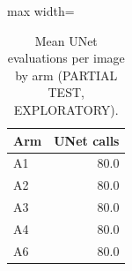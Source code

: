 \begin{table}[t]\centering\small
\caption{Mean UNet evaluations per image by arm (PARTIAL TEST, EXPLORATORY).}\label{tab:partial-cost}
\begin{adjustbox}{max width=\linewidth}
\begin{tabular}{lr}
\toprule
Arm & UNet calls \\
\midrule
A1 & 80.0 \\
A2 & 80.0 \\
A3 & 80.0 \\
A4 & 80.0 \\
A6 & 80.0 \\
\bottomrule
\end{tabular}
\end{adjustbox}
\end{table}
